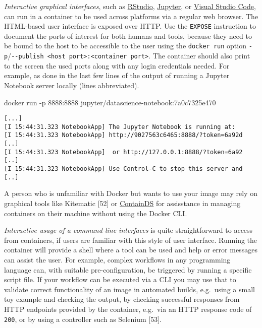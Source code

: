\documentclass[10pt,letterpaper]{article}
\newenvironment{Shaded}{\begin{snugshade}}{\end{snugshade}}
\newcommand{\ExtensionTok}[1]{#1}
\newcommand{\NormalTok}[1]{#1}
\begin{document}
\emph{Interactive graphical interfaces}, such as
\href{https://rstudio.com/products/rstudio/}{RStudio},
\href{https://jupyter.org/}{Jupyter}, or
\href{https://code.visualstudio.com/}{Visual Studio Code}, can run in a
container to be used across platforms via a regular web browser. The
HTML-based user interface is exposed over HTTP. Use the \texttt{EXPOSE}
instruction to document the ports of interest for both humans and tools,
because they need to be bound to the host to be accessible to the user
using the \texttt{docker\ run} option
\texttt{-p}/\texttt{-\/-publish\ \textless{}host\ port\textgreater{}:\textless{}container\ port\textgreater{}}.
The container should also print to the screen the used ports along with
any login credentials needed. For example, as done in the last few lines
of the output of running a Jupyter Notebook server locally (lines
abbreviated).

\begin{Shaded}
\begin{Highlighting}[]
\ExtensionTok{docker}\NormalTok{ run -p 8888:8888 jupyter/datascience-notebook:7a0c7325e470}
\end{Highlighting}
\end{Shaded}

\begin{verbatim}
[...]
[I 15:44:31.323 NotebookApp] The Jupyter Notebook is running at:
[I 15:44:31.323 NotebookApp] http://9027563c6465:8888/?token=6a92d [..]
[I 15:44:31.323 NotebookApp]  or http://127.0.0.1:8888/?token=6a92 [..]
[I 15:44:31.323 NotebookApp] Use Control-C to stop this server and [..]
\end{verbatim}

A person who is unfamiliar with Docker but wants to use your image may
rely on graphical tools like Kitematic {[}52{]} or
\href{https://containds.com/}{ContainDS} for assisstance in managing
containers on their machine without using the Docker CLI.

\emph{Interactive usage of a command-line interfaces} is quite
straightforward to access from containers, if users are familiar with
this style of user interface. Running the container will provide a shell
where a tool can be used and help or error messages can assist the user.
For example, complex workflows in any programming language can, with
suitable pre-configuration, be triggered by running a specific script
file. If your workflow can be executed via a CLI you may use that to
validate correct functionality of an image in automated builds,
e.g.~using a small toy example and checking the output, by checking
successful responses from HTTP endpoints provided by the container,
e.g.~via an HTTP response code of \texttt{200}, or by using a controller
such as Selenium {[}53{]}.
\end{document}
